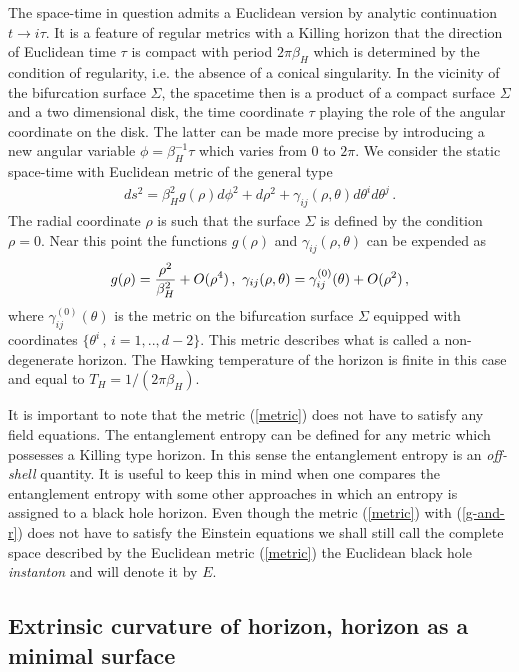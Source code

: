 \documentclass[12pt]{article}
\def\be{\begin{eqnarray}}
\def\ee{\end{eqnarray}}
\def\lb{\label}
\begin{document}
The space-time in question admits a Euclidean version by analytic continuation $t\rightarrow i\tau$. It is a feature of regular metrics with a Killing horizon  that the direction of Euclidean time $\tau$ is compact with  period $2\pi\beta_H$ which is determined by the condition of regularity, i.e.
the absence of a conical singularity. In the vicinity of the bifurcation surface $\Sigma$, the spacetime then is a product of a compact surface $\Sigma$ and a
two dimensional disk, the time coordinate $\tau$ playing the role of the angular coordinate on the disk. The latter can be made more precise by introducing a new angular variable $\phi=\beta^{-1}_H\tau$ which varies from $0$ to $2\pi$.
We consider the static space-time with  Euclidean metric of the general type
\be
ds^2={\beta^2_H}g(\rho)d\phi^2+d\rho^2+\gamma_{ij}(\rho,\theta)d\theta^id\theta^j\, .
\lb{metric}
\ee
The radial coordinate $\rho$ is such that the surface  $\Sigma$ is defined by the condition $\rho=0$. Near this point the functions $g(\rho)$ and $\gamma_{ij}(\rho,\theta)$
can be expended as
\be
g(\rho)={\rho^2\over \beta_H^2}+O(\rho^4)\, , \,\, \gamma_{ij}(\rho,\theta)=\gamma_{ij}^{(0)}(\theta)+O(\rho^2)\, ,
\lb{g-and-r}
\ee
where $\gamma_{ij}^{(0)}(\theta)$ is the metric on the bifurcation surface $\Sigma$ equipped  with coordinates $\{\theta^i\, , \, i=1,..,d-2\}$. This metric describes what is called a non-degenerate horizon. The Hawking temperature of the horizon is finite in this case and equal to $T_H=1/(2\pi\beta_H)$.

It is important to note that  the metric (\ref{metric}) does not have to satisfy any field equations.  The entanglement entropy can be defined for any metric which possesses a Killing type horizon. In this sense the entanglement entropy is an {\it off-shell} quantity. It is useful to keep this in mind when one compares the entanglement entropy with some other approaches in which an entropy is assigned to a black hole horizon. Even though the metric (\ref{metric})
with (\ref{g-and-r}) does not have to satisfy the Einstein equations we shall still call the complete space described by the Euclidean metric
(\ref{metric}) the Euclidean black hole {\it instanton} and will denote it by $E$.

 
\subsection{Extrinsic curvature of horizon, horizon as a minimal surface}
\end{document}
